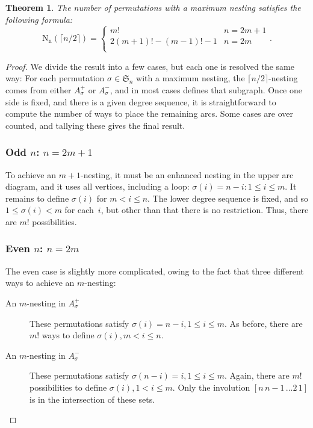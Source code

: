 \documentclass{amsart}
\newtheorem{theorem}{Theorem}
\begin{document}
\begin{theorem}
The number of permutations with a maximum nesting satisfies the following formula:
\begin{equation}
  {\operatorname{N_n}}( \lceil n/2\rceil )= \left\{  \begin{array}{ll} 
                                                    m! & n=2m+1\\
                                                    2(m+1)!-(m-1)!-1 & n=2m\\
                                                    \end{array}.
                 \right.
\end{equation}
\end{theorem}
\begin{proof}
We divide the result into a few cases, but each one is resolved the same way: For each permutation $\sigma\in{\mathfrak{S}_n}$ with a maximum nesting, the $ \lceil n/2\rceil $-nesting comes from either $A_\sigma^+$ or $A_\sigma^{-}$, and in most cases defines that subgraph. Once one side is fixed, and there is a given degree sequence, it is straightforward to compute the number of ways to place the remaining arcs. Some cases are over counted, and tallying these gives the final result.

\subsubsection*{Odd $n$: $n=2m+1$} To achieve an $m+1$-nesting, it must be an enhanced nesting in the upper arc diagram, and it uses all vertices, including a loop: $\sigma(i)=n-i: 1\leq i\leq m$. It remains to define $\sigma(i)$ for $m<i\leq n$. The lower degree sequence is fixed, and so $1\leq \sigma(i)<m$ for each~$i$, but other than that there is no restriction. Thus, there are $m!$ possibilities.

\subsubsection*{Even $n$: $n=2m$} The even case is slightly more complicated, owing to the fact that three different ways to achieve an $m$-nesting:
\begin{description}
\item[An $m$-nesting in $A_\sigma^+$]
These permutations satisfy $\sigma(i)=n-i, 1\leq i
\leq m$. As before, there are $m!$ ways to define $\sigma(i), m<i\leq n$. 

\item[An $m$-nesting in $A_\sigma^{-}$]
These permutations satisfy $\sigma(n-i)=i, 1\leq i\leq m$. Again, there are $m!$ possibilities to define $\sigma(i), 1<i\leq m$. Only the  involution $[n\, n-1\, \dots 2\, 1]$ is in the intersection of these sets. 


\end{description}
\end{proof}
\end{document}
